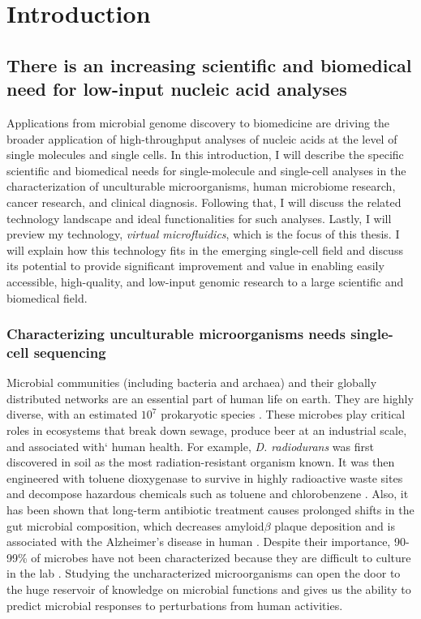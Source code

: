 \chapter{Introduction}
\section{There is an increasing scientific and biomedical need for low-input nucleic acid analyses}

Applications from microbial genome discovery to biomedicine\cite{Blainey:2013hn,Marshall:2012jz,Wang:2012bb,Huggett:2015hp,Evrony:2016du,Evrony:2012dl,Rinke:2013bt,Navin:2011jq} are driving the broader application of high-throughput analyses of nucleic acids at the level of single molecules and single cells. In this introduction, I will describe the specific scientific and biomedical needs for single-molecule and single-cell analyses in the characterization of unculturable microorganisms, human microbiome research, cancer research, and clinical diagnosis. Following that, I will discuss the related technology landscape and ideal functionalities for such analyses. Lastly, I will preview my technology, \textit{virtual microfluidics}, which is the focus of this thesis. I will explain how this technology fits in the emerging single-cell field and discuss its potential to provide significant improvement and value in enabling easily accessible, high-quality, and low-input genomic research to a large scientific and biomedical field. 

\subsection{Characterizing unculturable microorganisms needs single-cell sequencing}

Microbial communities (including bacteria and archaea) and their globally distributed networks are an essential part of human life on earth. They are highly diverse, with an estimated $10^{7}$ prokaryotic species \cite{Curtis:2002dj}. These microbes play critical roles in ecosystems that break down sewage, produce beer at an industrial scale, and associated with` human health. For example, \textit{D. radiodurans} was first discovered in soil as the most radiation-resistant organism known. It was then engineered with toluene dioxygenase to survive in highly radioactive waste sites and decompose hazardous chemicals such as toluene and chlorobenzene \cite{Lange:1998ea}. Also, it has been shown that long-term antibiotic treatment causes prolonged shifts in the gut microbial composition, which decreases amyloid$\beta$ plaque deposition and is associated with the Alzheimer's disease in human \cite{Minter:2016ga}. Despite their importance, 90-99\% of microbes have not been characterized because they are difficult to culture in the lab \cite{Yilmaz:2011bc}. Studying the uncharacterized microorganisms can open the door to the huge reservoir of knowledge on microbial functions and gives us the ability to predict microbial responses to perturbations from human activities.  

